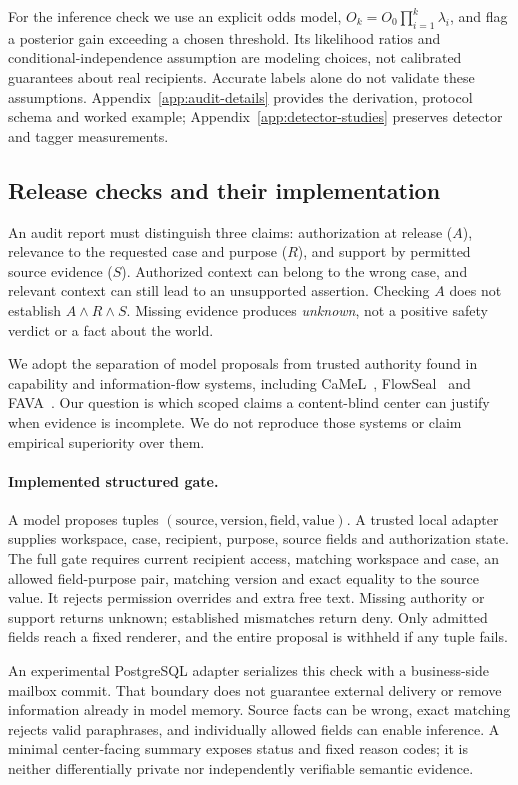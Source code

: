 For the inference check we use an explicit odds model,
$O_k=O_0\prod_{i=1}^k\lambda_i$, and flag a posterior gain exceeding a chosen
threshold. Its likelihood ratios and conditional-independence assumption are
modeling choices, not calibrated guarantees about real recipients. Accurate
labels alone do not validate these assumptions. Appendix~\ref{app:audit-details}
provides the derivation, protocol schema and worked example;
Appendix~\ref{app:detector-studies} preserves detector and tagger measurements.

\subsection{Release checks and their implementation}\label{sec:methodology}
An audit report must distinguish three claims: authorization at release ($A$),
relevance to the requested case and purpose ($R$), and support by permitted
source evidence ($S$). Authorized context can belong to the wrong case, and
relevant context can still lead to an unsupported assertion. Checking $A$ does
not establish $A\land R\land S$. Missing evidence produces \emph{unknown}, not a
positive safety verdict or a fact about the world.

We adopt the separation of model proposals from trusted authority found in
capability and information-flow systems, including CaMeL~\cite{camel2025},
FlowSeal~\cite{flowseal2026} and FAVA~\cite{fava2026}. Our question is which scoped
claims a content-blind center can justify when evidence is incomplete. We do
not reproduce those systems or claim empirical superiority over them.

\paragraph{Implemented structured gate.}\label{sec:structured-release}
A model proposes tuples $(\mathrm{source},\mathrm{version},\mathrm{field},\mathrm{value})$.
A trusted local adapter supplies workspace, case, recipient, purpose, source
fields and authorization state. The full gate requires current recipient access,
matching workspace and case, an allowed field-purpose pair, matching version and
exact equality to the source value. It rejects permission overrides and extra
free text. Missing authority or support returns unknown; established mismatches
return deny. Only admitted fields reach a fixed renderer, and the entire proposal
is withheld if any tuple fails.

An experimental PostgreSQL adapter serializes this check with a business-side
mailbox commit. That boundary does not guarantee external delivery or remove
information already in model memory. Source facts can be wrong, exact matching
rejects valid paraphrases, and individually allowed fields can enable inference.
A minimal center-facing summary exposes status and fixed reason codes; it is
neither differentially private nor independently verifiable semantic evidence.

